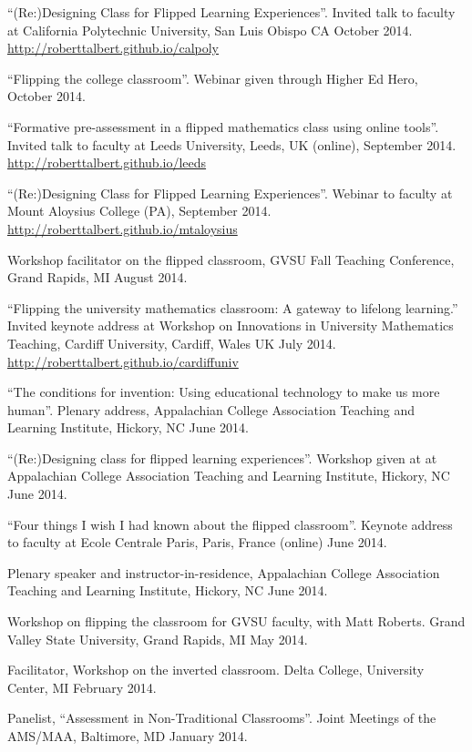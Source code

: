 \documentclass[letterpaper]{article}
\renewenvironment{itemize}{
  \begin{list}{}{
    \setlength{\leftmargin}{1.5em}
	\setlength{\itemsep}{0in}
  }
}{
  \end{list}
}
\begin{document}
\begin{itemize}
	\item ``(Re:)Designing Class for Flipped Learning Experiences''. Invited talk to faculty at California Polytechnic University, San Luis Obispo CA October 2014. \url{http://roberttalbert.github.io/calpoly}
	\item ``Flipping the college classroom''. Webinar given through Higher Ed Hero, October 2014.
	\item ``Formative pre-assessment in a flipped mathematics class using online tools''. Invited talk to faculty at Leeds University, Leeds, UK (online), September 2014. \url{http://roberttalbert.github.io/leeds}
	\item ``(Re:)Designing Class for Flipped Learning Experiences''. Webinar to faculty at Mount Aloysius College (PA), September 2014. \url{http://roberttalbert.github.io/mtaloysius}
	\item Workshop facilitator on the flipped classroom, GVSU Fall Teaching Conference, Grand Rapids, MI August 2014. 
	\item ``Flipping the university mathematics classroom: A gateway to lifelong learning.'' Invited keynote address at Workshop on Innovations in University Mathematics Teaching, Cardiff University, Cardiff, Wales UK July 2014. \url{http://roberttalbert.github.io/cardiffuniv}
	\item ``The conditions for invention: Using educational technology to make us more human''. Plenary address, Appalachian College Association Teaching and Learning Institute, Hickory, NC June 2014.
	\item ``(Re:)Designing class for flipped learning experiences''.  Workshop given at at Appalachian College Association Teaching and Learning Institute, Hickory, NC June 2014. 
	\item ``Four things I wish I had known about the flipped classroom''. Keynote address to faculty at Ecole Centrale Paris, Paris, France (online) June 2014. 
	\item Plenary speaker and instructor-in-residence, Appalachian College Association Teaching and Learning Institute, Hickory, NC June 2014. 
	\item Workshop on flipping the classroom for GVSU faculty, with Matt Roberts. Grand Valley State University, Grand Rapids, MI May 2014. 
	\item Facilitator, Workshop on the inverted classroom. Delta College, University Center, MI February 2014. 
	\item Panelist, ``Assessment in Non-Traditional Classrooms''. Joint Meetings of the AMS/MAA, Baltimore, MD January 2014. 

\end{itemize}
\end{document}

